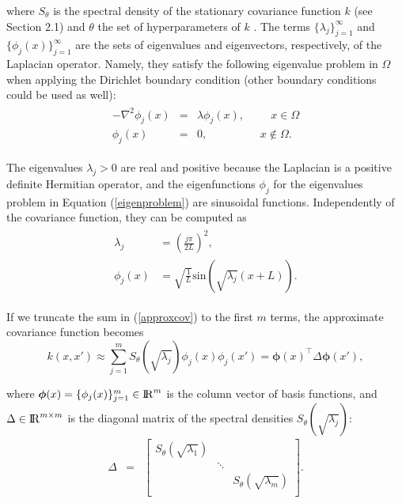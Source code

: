 \documentclass[]{interact}
\theoremstyle{plain}%
\theoremstyle{definition}
\theoremstyle{remark}
\begin{document}
\noindent where $S_{\theta}$ is the spectral density of the stationary covariance function $k$ (see Section 2.1) and $\theta$ the set of hyperparameters of $k$ \citep{rasmussen2006gaussian}. The terms $\{\lambda_j\}_{j=1}^{\infty}$ and $\{\phi_j(x)\}_{j=1}^{\infty}$ are the sets of eigenvalues and eigenvectors, respectively, of the Laplacian operator. Namely, they satisfy the following eigenvalue problem in $\Omega$ when applying the Dirichlet boundary condition (other boundary conditions could be used as well):
%
\begin{eqnarray}\label{eigenproblem}
\begin{split}
-\nabla^2 \phi_j(x)&=&\lambda \phi_j(x), \hspace{1cm}  x \in \Omega \\ 
\phi_j(x)&=&0, \hspace{2cm} x \notin \Omega.
\end{split}
\end{eqnarray} 

\noindent The eigenvalues $\lambda_j>0$ are real and positive because the Laplacian is a positive definite Hermitian operator, and the eigenfunctions $\phi_j$ for the eigenvalues problem in Equation (\ref{eigenproblem}) are sinusoidal functions. Independently of the covariance function, they can be computed as
%
\begin{eqnarray}\label{bf&lambda}
\begin{split}
\lambda_j&=\left(\frac{j\pi}{2L}\right)^2, \\
\phi_j(x)&=\sqrt{\frac{1}{L}} \text{sin}\left(\sqrt{\lambda_j}(x+L)\right).
\end{split}
\end{eqnarray}

If we truncate the sum in (\ref{approxcov}) to the first $m$ terms, the approximate covariance function becomes
%
\begin{equation}
k(x,x') \approx \sum_{j=1}^m S_{\theta}(\sqrt{\lambda_j}) \phi_j(x) \phi_j(x') = \boldsymbol{\phi}(x)^\intercal \Delta \boldsymbol{\phi}(x'), \nonumber
\end{equation}

\noindent where $\boldsymbol{\phi}(x)=\{\phi_j(x)\}_{j=1}^{m} \in {\rm I\!R}^{m}$ is the column vector of basis functions, and $\Delta  \in {\rm I\!R}^{m\times m}$ is the diagonal matrix of the spectral densities $S_{\theta}(\sqrt{\lambda_j})$: 
%
\begin{eqnarray}
\Delta &=&  \begin{bmatrix}
    S_{\theta}(\sqrt{\lambda_1}) & & \\
    & \ddots & \nonumber \\
    & & S_{\theta}(\sqrt{\lambda_m}) \\
  \end{bmatrix}.
\end{eqnarray}
\end{document}

